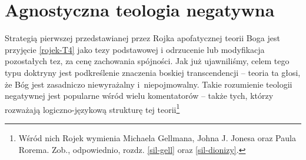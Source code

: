 

\section{Agnostyczna teologia negatywna}

Strategią pierwszej przedstawianej przez Rojka apofatycznej teorii Boga
jest przyjęcie \eqref{rojek-T4} jako tezy podstawowej i odrzucenie lub
modyfikacja pozostałych tez, za cenę zachowania spójności.
Jak już ujawniliśmy, celem tego typu doktryny jest podkreślenie znaczenia
boskiej transcendencji -- teoria ta głosi, że Bóg jest zasadniczo niewyrażalny
i~niepojmowalny. Takie rozumienie teologii negatywnej jest popularne wśród wielu
komentatorów -- także tych, którzy rozważają logiczno-językową strukturę
tej teorii\footnote{Wśród nich Rojek wymienia Michaela Gellmana, Johna J.
Jonesa oraz Paula Rorema. Zob., odpowiednio, rozdz. \ref{sil-gell} oraz \ref{sil-dionizy}.}

